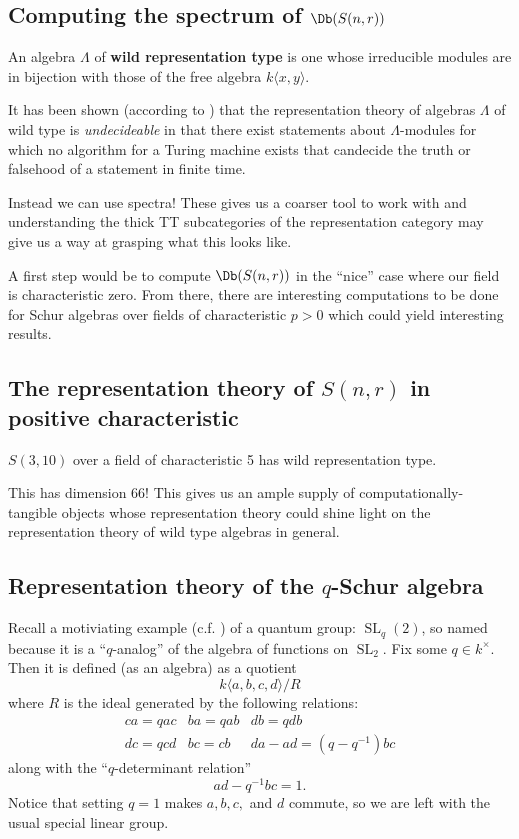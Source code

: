 \documentclass[12pt]{article}
\begin{document}
	\subsection{Computing the spectrum of \texorpdfstring{$\Db(S(n,r))$}{DbS(n,r)}}
	\begin{defn}
		An algebra $\Lambda$ of \textbf{wild representation type} is one whose irreducible 
		modules are in bijection with those of the free algebra $k\langle x,y\rangle$.
	\end{defn}
	\begin{thm} 
		It has been shown (according to \cite{bensonI}) that the representation theory of 
		algebras $\Lambda$ of wild type is \textit{undecideable} in that there exist statements about $\Lambda$-modules for which no algorithm for a Turing machine exists
		that candecide the truth or falsehood of a statement in finite time.
	\end{thm} 

	Instead we can use spectra! These gives us a coarser tool to work with and understanding the thick TT subcategories of 
	the representation category may give us a way at grasping what this looks like.

	A first step would be to compute $\Db(S(n,r))$ in the ``nice'' case where our field is characteristic zero. From there, there are interesting computations to be done 
	for Schur algebras over fields of characteristic $p>0$ which could yield interesting results.

	\subsection{The representation theory of \texorpdfstring{$S(n,r)$}{S(n,r)} in positive characteristic}
	\begin{thm}
		$S(3,10)$ over a field of characteristic 5 has wild representation type.
	\end{thm}

	This has dimension 66! This gives us an ample supply of computationally-tangible objects whose representation theory 
	could shine light on the representation theory of wild type algebras in general.

	\subsection{Representation theory of the \texorpdfstring{$q$}{q}-Schur algebra}
	Recall a motiviating example (c.f. \cite{majid}) of a quantum group: $\operatorname{SL}_q(2)$, so named because it is a ``$q$-analog'' of the algebra of functions on
	$\operatorname{SL}_2$. Fix some $q\in k^\times$. Then it is defined (as an algebra) as a quotient 
	\[k\langle a,b,c,d\rangle/R\]
	where $R$ is the ideal generated by the following relations:
	\[\begin{array}{ccc}
		ca=qac & ba=qab & db=qdb\\
		dc=qcd & bc=cb & da-ad=(q-q^{-1})bc
	\end{array}\]
	along with the ``$q$-determinant relation''
	\[ad-q^{-1}bc=1.\]
	Notice that setting $q=1$ makes $a,b,c,$ and $d$ commute, so we are left with the usual special linear group.
\end{document}
